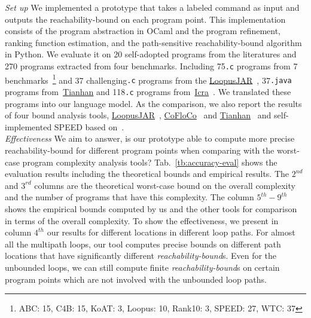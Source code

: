 \emph{Set up} We implemented a prototype {\THESYSTEM} that takes a labeled command as input 
and outputs the reachability-bound on each program point.
This implementation consists of the 
program abstraction in OCaml and the program refinement, ranking function estimation, and the path-sensitive reachability-bound algorithm in Python.
We evaluate it on 20 self-adopted programs from the literatures and 270 programs extracted from four benchmarks. 
Including 75{\tt .c} programs from 7 benchmarks~\cite{BenchmarkLoops}\footnote{ABC: 15, C4B: 15, KoAT: 3, Loopus: 10, Rank10: 3, SPEED: 27, WTC: 37} and 37 challenging{\tt .c} programs 
from the \hyperlink{https://forsyte.at/static/people/sinn/loopusJAR/index.html}{LoopusJAR}~\cite{BenchmarkLoops,SinnZV17},
37{\tt .java} programs from~\hyperlink{https://zenodo.org/record/5140586\#.Y5pBoC-B1QI}{Tianhan}\cite{BenchmarkTianhan,LuCT21}
and 118{\tt .c} programs from~\hyperlink{https://github.com/icra-team/icra}{Icra}~\cite{BenchmarkIcra,KincaidBCR19,CyphertBKR19}.
We translated these programs into our language model.
As the comparison, we also report the results of four bound analysis tools, 
\hyperlink{https://forsyte.at/software/loopus/}{LoopusJAR}~\cite{SinnZV17},
\hyperlink{https://github.com/aeflores/CoFloCo/tree/master/src}{CoFloCo}~\cite{ToolCofloco,Montoya17,Flores-Montoya16,Flores-MontoyaH14}
and \hyperlink{https://zenodo.org/record/5140586\#.Y5pBoC-B1QI}{Tianhan}~\cite{BenchmarkTianhan}
and self-implemented SPEED based on~\cite{GulwaniJK09}.
\\
\emph{Effectiveness} We aim to answer, is our prototype able to compute more precise reachability-bound for different program points when comparing with the worst-case program
complexity analysis tools?
Tab.~\ref{tb:accuracy-eval} shows the evaluation results including the theoretical bounds and empirical results.
The $2^{nd}$ and $3^{rd}$ columns are the theoretical worst-case bound on the overall complexity and the number of programs that have this complexity. The column $5^{th}-9^{th}$ shows the empirical bounds computed by us and the other tools for comparison in terms of the overall complexity.
To show the effectiveness, 
we present in column $4^{th}$ our results for different locations in different loop paths. For almost all the multipath loops, our tool computes precise bounds on different path locations that have significantly different \emph{reachability-bound}s.
Even for the unbounded loops, we can still compute finite \emph{reachability-bound}s on certain program points which are not involved with the unbounded loop paths.
